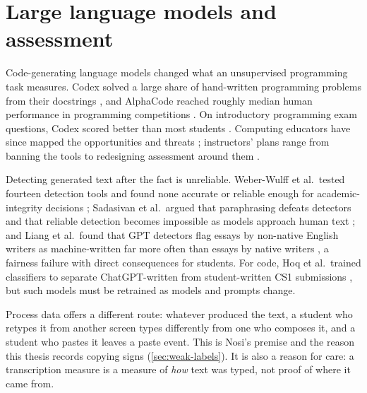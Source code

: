 \section{Large language models and assessment}
\label{sec:rw-llm}
Code-generating language models changed what an unsupervised programming
task measures. Codex solved a large share of hand-written programming
problems from their docstrings \cite{chen2021codex}, and AlphaCode reached
roughly median human performance in programming competitions
\cite{li2022alphacode}. On introductory programming exam questions, Codex
scored better than most students \cite{finnieansley2022robots}. Computing
educators have since mapped the opportunities and threats
\cite{becker2023programming,prather2023robots,denny2024genai}; instructors'
plans range from banning the tools to redesigning assessment around them
\cite{lau2023ban}.

Detecting generated text after the fact is unreliable. Weber-Wulff et al.\
tested fourteen detection tools and found none accurate or reliable enough for
academic-integrity decisions \cite{weberwulff2023testing}; Sadasivan et al.\
argued that paraphrasing defeats detectors and that reliable detection becomes
impossible as models approach human text \cite{sadasivan2023detected}; and
Liang et al.\ found that GPT detectors flag essays by non-native English
writers as machine-written far more often than essays by native writers
\cite{liang2023gptdetectors}, a fairness failure with direct consequences for
students. For code, Hoq et al.\ trained classifiers to separate ChatGPT-written
from student-written CS1 submissions \cite{hoq2024chatgpt}, but such models
must be retrained as models and prompts change.

Process data offers a different route: whatever produced the text, a student
who retypes it from another screen types differently from one who composes it,
and a student who pastes it leaves a paste event. This is Nosi's premise
\cite{lueder2026nosi} and the reason this thesis records copying signs
(\cref{sec:weak-labels}). It is also a reason for care: a transcription
measure is a measure of \emph{how} text was typed, not proof of where it came
from.

